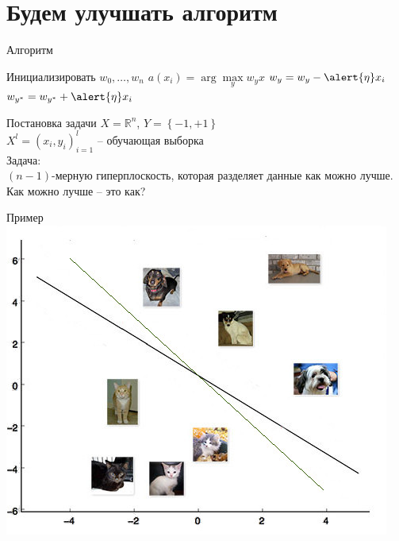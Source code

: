 \documentclass[10pt]{beamer}
\begin{document}
\section{Будем улучшать алгоритм}

\begin{frame}{Алгоритм}
	\begin{algorithmic}[1]
            \State Инициализировать ${w_0, \dots, w_n}$
                 \State $a(x_i) = \arg\max\limits_{y} w_y x$                 
                   \State $w_y = w_y - \alert{\eta} x_i$
                   \State $w_{y^{*}} = w_{y^{*}} + \alert{\eta} x_i$
                 \EndIf  
               \EndFor
           	\EndRepeat
        \EndFunction
    \end{algorithmic}
\end{frame}

\begin{frame}{Постановка задачи}
  $X = \mathbb{R}^n$, ${Y = \left\{ -1, + 1\right\}}$\\
  ${X^l = (x_i, y_i)_{i = 1}^l}$ -- обучающая выборка\\
  \bigbreak
  \alert{Задача}:\\
  $(n-1)$-мерную гиперплоскость, которая разделяет данные \alert{как можно лучше}.
  \bigbreak \pause
  Как можно лучше -- это как?
\end{frame}

\begin{frame}{Пример}
  \centering
  \includegraphics[width=0.9 \textwidth, keepaspectratio]{images/catdog}
\end{frame}
\end{document}
